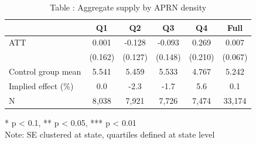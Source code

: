 \begin{table}[t]
\caption*{
{\fontsize{20}{25}\selectfont  Table : Aggregate supply by APRN density\fontsize{12}{15}\selectfont }
} 
\fontsize{12.0pt}{14.0pt}\selectfont
\begin{tabular*}{\linewidth}{@{\extracolsep{\fill}}lccccc}
\toprule
  & Q1 & Q2 & Q3 & Q4 & Full \\ 
\midrule\addlinespace[2.5pt]
ATT & 0.001 & -0.128 & -0.093 & 0.269 & 0.007 \\ 
 & (0.162) & (0.127) & (0.148) & (0.210) & (0.067) \\ 
Control group mean & 5.541 & 5.459 & 5.533 & 4.767 & 5.242 \\ 
Implied effect (\%) & 0.0 & -2.3 & -1.7 & 5.6 & 0.1 \\ 
N & 8,038 & 7,921 & 7,726 & 7,474 & 33,174 \\ 
\bottomrule
\end{tabular*}
\begin{minipage}{\linewidth}
* p < 0.1, ** p < 0.05, *** p < 0.01\\
Note: SE clustered at state, quartiles defined at state level\\
\end{minipage}
\end{table}

